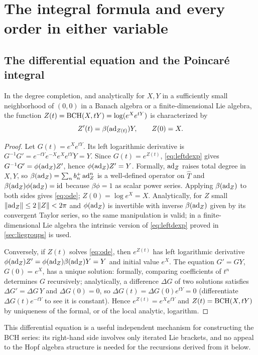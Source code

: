 \section{The integral formula and every order in either variable}\label{sec:integral}
\subsection{The differential equation and the Poincar\'e integral}
\begin{theorem}\label{thm:ode}
In the degree completion, and analytically for $X,Y$ in a sufficiently
small neighborhood of $(0,0)$ in a Banach algebra or a finite-dimensional
Lie algebra, the function $Z(t)=\operatorname{BCH}(X,tY)=\log(e^Xe^{tY})$ is
characterized by
\begin{equation}\label{eq:ode}
 Z'(t)=\beta(\operatorname{ad}_{Z(t)})Y,\qquad Z(0)=X.
\end{equation}
\end{theorem}
\begin{proof}
Let $G(t)=e^Xe^{tY}$. Its left logarithmic derivative is
$G^{-1}G'=e^{-tY}e^{-X}e^Xe^{tY}Y=Y$. Since $G(t)=e^{Z(t)}$,
\eqref{eq:leftdexp} gives $G^{-1}G'=\phi(\operatorname{ad}_{Z})Z'$, hence
$\phi(\operatorname{ad}_Z)Z'=Y$. Formally, $\operatorname{ad}_Z$ raises total degree in $X,Y$, so
$\beta(\operatorname{ad}_Z)=\sum_nb^{+}_{n}\operatorname{ad}_Z^n$ is a well-defined operator on
$\widehat T$ and $\beta(\operatorname{ad}_Z)\phi(\operatorname{ad}_Z)=\operatorname{id}$ because $\beta\phi=1$ as
scalar power series. Applying $\beta(\operatorname{ad}_Z)$ to both sides gives
\eqref{eq:ode}; $Z(0)=\log e^X=X$. Analytically, for $Z$ small
$\left\lVert\operatorname{ad}_Z\right\rVert\leq2\left\lVert Z\right\rVert<2\pi$ and $\phi(\operatorname{ad}_Z)$ is invertible with inverse
$\beta(\operatorname{ad}_Z)$ given by its convergent Taylor series, so the same
manipulation is valid; in a finite-dimensional Lie algebra the intrinsic
version of \eqref{eq:leftdexp} proved in \cref{sec:liegroups} is used.

Conversely, if $Z(t)$ solves \eqref{eq:ode}, then $e^{Z(t)}$ has left
logarithmic derivative $\phi(\operatorname{ad}_Z)Z'=\phi(\operatorname{ad}_Z)\beta(\operatorname{ad}_Z)Y=Y$ and
initial value $e^X$. The equation $G'=GY$, $G(0)=e^X$, has a unique
solution: formally, comparing coefficients of $t^n$ determines $G$
recursively; analytically, a difference $\Delta G$ of two solutions
satisfies $\Delta G'=\Delta G\,Y$ and $\Delta G(0)=0$, so
$\Delta G(t)=\Delta G(0)e^{tY}=0$ (differentiate $\Delta G(t)e^{-tY}$ to
see it is constant). Hence $e^{Z(t)}=e^Xe^{tY}$ and $Z(t)=\operatorname{BCH}(X,tY)$ by
uniqueness of the formal, or of the local analytic, logarithm.
\end{proof}
This differential equation is a useful independent mechanism for
constructing the BCH series: its right-hand side involves only iterated
Lie brackets, and no appeal to the Hopf algebra structure is needed for the
recursions derived from it below.

